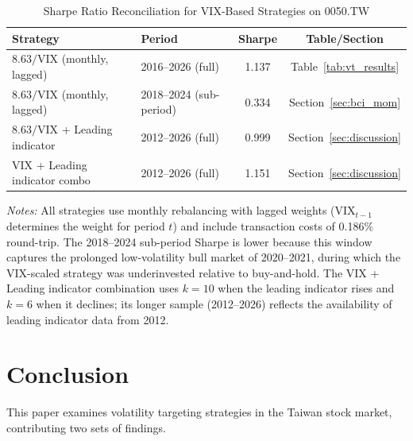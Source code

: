 \begin{table}[H]
\centering
\caption{Sharpe Ratio Reconciliation for VIX-Based Strategies on 0050.TW}
\label{tab:sharpe_reconciliation}
\begin{tabular}{llcc}
\toprule
Strategy & Period & Sharpe & Table/Section \\
\midrule
$8.63/\text{VIX}$ (monthly, lagged) & 2016--2026 (full) & 1.137 & Table~\ref{tab:vt_results} \\ %
$8.63/\text{VIX}$ (monthly, lagged) & 2018--2024 (sub-period) & 0.334 & Section~\ref{sec:bci_mom} \\
$8.63/\text{VIX}$ + Leading indicator & 2012--2026 (full) & 0.999 & Section~\ref{sec:discussion} \\
VIX + Leading indicator combo & 2012--2026 (full) & 1.151 & Section~\ref{sec:discussion} \\
\bottomrule
\end{tabular}
\begin{flushleft}
\small \textit{Notes:} All strategies use monthly rebalancing with lagged weights (VIX$_{t-1}$ determines the weight for period $t$) and include transaction costs of 0.186\% round-trip. The 2018--2024 sub-period Sharpe is lower because this window captures the prolonged low-volatility bull market of 2020--2021, during which the VIX-scaled strategy was underinvested relative to buy-and-hold. The VIX + Leading indicator combination uses $k = 10$ when the leading indicator rises and $k = 6$ when it declines; its longer sample (2012--2026) reflects the availability of leading indicator data from 2012.
\end{flushleft}
\end{table}


\section{Conclusion}
\label{sec:conclusion}

This paper examines volatility targeting strategies in the Taiwan stock market, contributing two sets of findings.

